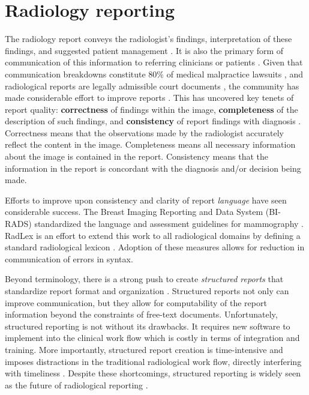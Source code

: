 \section{Radiology reporting}
The radiology report conveys the radiologist's findings, interpretation of these findings, and suggested patient management \cite{Langlotz:2015vq}.
It is also the primary form of communication of this information to referring clinicians or patients \cite{Sistrom:2005cx}.
Given that communication breakdowns constitute 80\% of medical malpractice lawsuits \cite{Levinson:1994ko}, and radiological reports are legally admissible court documents \cite{Oppenheim:2012tq}, the community has made considerable effort to improve reports \cite{Langlotz:2015vq}.
This has uncovered key tenets of report quality: \textbf{correctness} of findings within the image, \textbf{completeness} of the description of such findings, and \textbf{consistency} of report findings with diagnosis \cite{Johnson:2004kh, HaraldO:2004hi, Reiner:2006fa}. 
Correctness means that the observations made by the radiologist accurately reflect the content in the image. 
Completeness means all necessary information about the image is contained in the report. 
Consistency means that the information in the report is concordant with the diagnosis and/or decision being made.

Efforts to improve upon consistency and clarity of report \emph{language} have seen considerable success.
The Breast Imaging Reporting and Data System (BI-RADS) standardized the language and assessment guidelines for mammography \cite{Liberman:ws,Langlotz:2009fn,Burnside:2009ki}.
RadLex is an effort to extend this work to all radiological domains by defining a standard radiological lexicon \cite{Langlotz:2006jn}.
Adoption of these measures allows for reduction in communication of errors in syntax.

Beyond terminology, there is a strong push to create \emph{structured reports} that standardize report format and organization \cite{Langlotz:2009dd,Reiner:2009ib}.
Structured reports not only can improve communication, but they allow for computability of the report information beyond the constraints of free-text documents.
Unfortunately, structured reporting is not without its drawbacks.
It requires new software to implement into the clinical work flow which is costly in terms of integration and training.
More importantly, structured report creation is time-intensive and imposes distractions in the traditional radiological work flow, directly interfering with timeliness \cite{Weiss:2008er}.
Despite these shortcomings, structured reporting is widely seen as the future of radiological reporting \cite{Langlotz:2015vq}.


